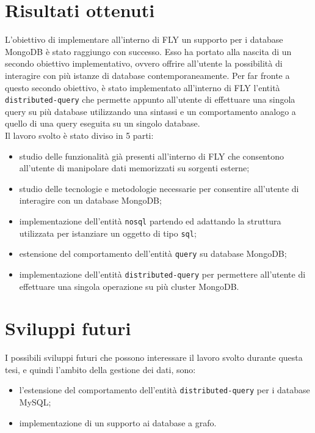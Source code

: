 \section{Risultati ottenuti}
L'obiettivo di implementare all'interno di FLY un supporto per i database MongoDB è stato raggiungo con successo. Esso ha portato alla nascita di un secondo obiettivo implementativo, ovvero offrire all'utente la possibilità di interagire con più istanze di database contemporaneamente. Per far fronte a questo secondo obiettivo, è stato implementato all'interno di FLY l'entità \verb|distributed-query| che permette appunto all'utente di effettuare una singola query su più database utilizzando una sintassi e un comportamento analogo a quello di una query eseguita su un singolo database. \\
Il lavoro svolto è stato diviso in 5 parti:
\begin{itemize}
    \item studio delle funzionalità già presenti all'interno di FLY che consentono all'utente di manipolare dati memorizzati su sorgenti esterne;
    \item studio delle tecnologie e metodologie necessarie per consentire all'utente di interagire con un database MongoDB;
    \item implementazione dell'entità \verb|nosql| partendo ed adattando la struttura utilizzata per istanziare un oggetto di tipo \verb|sql|;
    \item estensione del comportamento dell'entità \verb|query| su database MongoDB;
    \item implementazione dell'entità \verb|distributed-query| per permettere all'utente di effettuare una singola operazione su più cluster MongoDB.
\end{itemize}

\section{Sviluppi futuri}
I possibili sviluppi futuri che possono interessare il lavoro svolto durante questa tesi, e quindi l'ambito della gestione dei dati, sono:
\begin{itemize}
    \item l'estensione del comportamento dell'entità \verb|distributed-query| per i database MySQL;
    \item implementazione di un supporto ai database a grafo.
\end{itemize}

